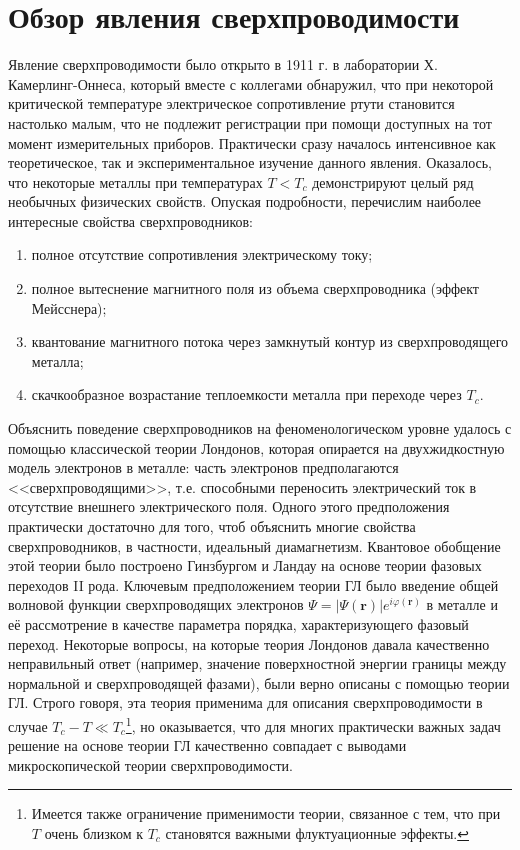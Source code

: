 \section{Обзор явления сверхпроводимости} \label{s1_sc_phys}
Явление сверхпроводимости было открыто в 1911 г. в лаборатории Х. Камерлинг-Оннеса, который вместе с коллегами обнаружил, что при некоторой критической температуре электрическое сопротивление ртути становится настолько малым, что не подлежит регистрации при помощи доступных на тот момент измерительных приборов. Практически сразу началось интенсивное как теоретическое, так и экспериментальное изучение данного явления. Оказалось, что некоторые металлы при температурах $T<T_c$ демонстрируют целый ряд необычных физических свойств. Опуская подробности, перечислим наиболее интересные свойства сверхпроводников:
\begin{enumerate}
	\item полное отсутствие сопротивления электрическому току;
	\item полное вытеснение магнитного поля из объема сверхпроводника (эффект Мейсснера);
	\item квантование магнитного потока через замкнутый контур из сверхпроводящего металла;
	\item скачкообразное возрастание теплоемкости металла при переходе через $T_c$.
\end{enumerate}	
Объяснить поведение сверхпроводников на феноменологическом уровне удалось с помощью классической теории Лондонов, которая опирается на двухжидкостную модель электронов в металле: часть электронов предполагаются <<сверхпроводящими>>, т.е. способными переносить электрический ток в отсутствие внешнего электрического поля. Одного этого предположения практически достаточно для того, чтоб объяснить многие свойства сверхпроводников, в частности, идеальный диамагнетизм. Квантовое обобщение этой теории было построено Гинзбургом и Ландау на основе теории фазовых переходов II рода. Ключевым предположением теории ГЛ было введение общей волновой функции сверхпроводящих электронов $\Psi = |\Psi(\mathbf{r})| e^{i\varphi({\mathbf{r}})}$ в металле и её рассмотрение в качестве параметра порядка, характеризующего фазовый переход. Некоторые вопросы, на которые теория Лондонов давала качественно неправильный ответ (например, значение поверхностной энергии границы между нормальной и сверхпроводящей фазами), были верно описаны с помощью теории ГЛ. Строго говоря, эта теория применима для описания сверхпроводимости в случае $T_c-T \ll T_c$\footnote[1]{Имеется также ограничение применимости теории, связанное с тем, что при $T$ очень близком к $T_c$ становятся важными флуктуационные эффекты.}, но оказывается, что для многих практически важных задач решение на основе теории ГЛ качественно совпадает с выводами микроскопической теории сверхпроводимости.

